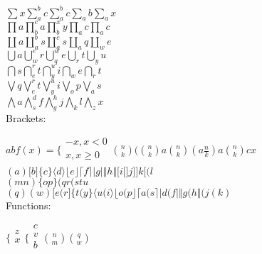 \documentclass[12pt,a4paper]{article}
\begin{document}
$\sum{x}\sum_{a}^{b}{c}\sum_{a}^{b}{c}\sum_{a}{b}\sum_{a}{x}$\\


$\prod{a}\prod_{b}^{c}{a}\prod_{b}^{x}{y}\prod_{a}{c}\prod_{a}{c}$\\


$
\coprod{a}\coprod_{a}^{b}{s}\coprod_{a}^{c}{s}\coprod_{a}{q}\coprod_{w}{e}
$\\


$
\bigcup{a}\bigcup_{w}^{e}{r}\bigcup_{q}^{w}{e}\bigcup_{r}{t}\bigcup_{y}{u}
$\\


$
\bigcap{s}\bigcap_{e}^{r}{t}\bigcap_{y}^{u}{i}\bigcap_{w}{e}\bigcap_{r}{t}
$\\


$
\bigvee{q}\bigvee_{e}^{r}{t}\bigvee_{y}^{u}{i}\bigvee_{o}{p}\bigvee_{a}{s}
$\\


$
\bigwedge{a}\bigwedge_{s}^{d}{f}\bigwedge_{g}^{h}{j}\bigwedge_{k}{l}\bigwedge_{z}{x}
$\\


Brackets:

$ab f(x)=\bigg\{ 
\begin{gathered}
-x, x<0 \\
x, x\ge 0 \\
\end{gathered}
\binom{n}{k}(\binom{n}{k}a\binom{n}{k}(a\frac{n}{k})a\binom{n}{k}cx$\\


$(a)\lbrack b\rbrack \lbrace c\rbrace \langle d\rangle \lfloor e\rfloor 
\lceil f\rceil \vert g\vert \Vert h\Vert \lbrack i\lbrack \rbrack 
j\rbrack \rbrack k\lbrack (l$\\


$(mn)\lbrace op\rbrace (qr(stu$\\


$(q)(w)\lbrack e(r\rbrack \lbrace t(y\rbrace \langle u(i\rangle \lfloor 
o(p\rfloor \lceil a(s\rceil \vert d(f\vert \Vert g(h\Vert (j(k)$\\


Functions:

$\bigg\{ 
\begin{gathered}
z \\
x \\
\end{gathered}
\bigg\{ 
\begin{gathered}
c \\
v \\
b \\
\end{gathered}
\binom{n}{m}\binom{q}{w}$\\
\end{document}
